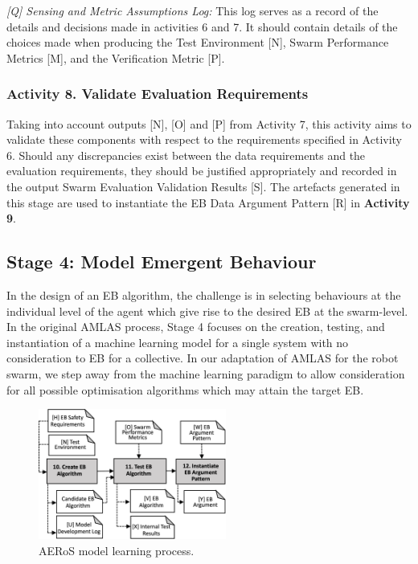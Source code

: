 \documentclass[runningheads]{llncs}
\begin{document}
\emph{[Q] Sensing and Metric Assumptions Log:} This log serves as a record of the details and decisions made in activities 6 and 7. It should contain details of the choices made when producing the Test Environment [N], Swarm Performance Metrics [M], and the Verification Metric [P].
\vspace{-2ex}
\subsubsection*{Activity 8. Validate Evaluation Requirements}

Taking into account outputs [N], [O] and [P] from Activity 7, this activity aims to validate these components with respect to the requirements specified in Activity 6. Should any discrepancies exist between the data requirements and the evaluation requirements, they should be justified appropriately and recorded in the output Swarm Evaluation Validation Results [S]. 
The artefacts generated in this stage are used to instantiate the EB Data Argument Pattern [R] in \textbf{Activity 9}.

\vspace{-2ex}
\subsection{Stage 4: Model Emergent Behaviour} \label{framework-stage4}
In the design of an EB algorithm, the challenge is in selecting behaviours at the individual level of the agent which give rise to the desired EB at the swarm-level. 
In the original AMLAS process, Stage 4 focuses on the creation, testing, and instantiation of a machine learning model for a single system with no consideration to EB for a collective. 
In our adaptation of AMLAS for the robot swarm,  we step away from the machine learning paradigm to allow consideration for all possible optimisation algorithms which may attain the target EB.

\begin{figure}[!h]
\centering
\includegraphics[width=0.55\textwidth]{figures/AMLAS-STAGE-4-V5.png}%
\vspace{-2ex}
\caption{AERoS model learning process.}
\label{amlas-a-stage4}
\vspace{-4ex}
\end{figure}
\end{document}
